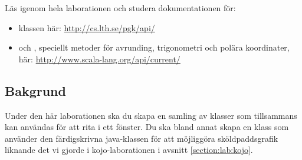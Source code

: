 

\Lab{\LabWeekFIVE}

\begin{Goals}

\end{Goals}

\begin{Preparations}
\item {}

\item Läs igenom hela laborationen och studera dokumentationen för:
\begin{itemize}[nolistsep,noitemsep]
\item klassen  här: \url{http://cs.lth.se/pgk/api/}

\item {} och , speciellt metoder för avrunding, trigonometri och polära koordinater, här:
\url{http://www.scala-lang.org/api/current/} 
\end{itemize}

\end{Preparations}

\subsection{Bakgrund}

Under den här laborationen ska du skapa en samling av klasser som tillsammans kan användas för att rita i ett fönster. Du ska bland annat skapa en klass  som använder den färdigskrivna java-klassen  för att möjliggöra sköldpaddsgrafik liknande det vi gjorde i kojo-laborationen i avsnitt \ref{section:lab:kojo}. 



